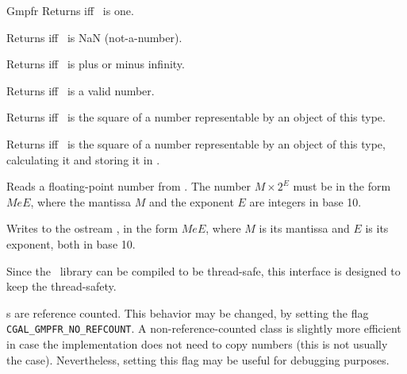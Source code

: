 \begin{ccRefClass} {Gmpfr}
        {Returns  iff \ccVar~is one.}

        {Returns  iff \ccVar~is NaN (not-a-number).}

        {Returns  iff \ccVar~is plus or minus infinity.}

        {Returns  iff \ccVar~is a valid number.}

        {Returns  iff \ccVar~is the square of a number
        representable by an object of this type.}

        {Returns  iff \ccVar~is the square of a number
        representable by an object of this type, calculating it and storing
        it in .}



        {Reads a floating-point number from . The number
        \(M \times 2^E\) must be in the form \(MeE\), where the mantissa
        \(M\) and the exponent \(E\) are integers in base 10.}

        {Writes  to the ostream , in the form
        \(MeE\), where \(M\) is its mantissa and \(E\) is its exponent,
        both in base 10.}


\ccImplementation

Since the \mpfr\ library can be compiled to be thread-safe, this interface
is designed to keep the thread-safety.

s are reference counted. This behavior may be changed, by
setting the flag \verb+CGAL_GMPFR_NO_REFCOUNT+. A non-reference-counted
class is slightly more efficient in case the implementation does not need
to copy numbers (this is not usually the case). Nevertheless, setting this
flag may be useful for debugging purposes.

\ccSeeAlso
{}\\

\end{ccRefClass}
